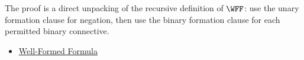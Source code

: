 \begin{remark*}
The proof is a direct unpacking of the recursive definition of
\(\WFF\): use the unary formation clause for negation, then use the binary
formation clause for each permitted binary connective.
\end{remark*}

\begin{dependencies}
\begin{itemize}
  \item \hyperref[def:well-formed-formula]{Well-Formed Formula}
\end{itemize}
\end{dependencies}

\clearpage
